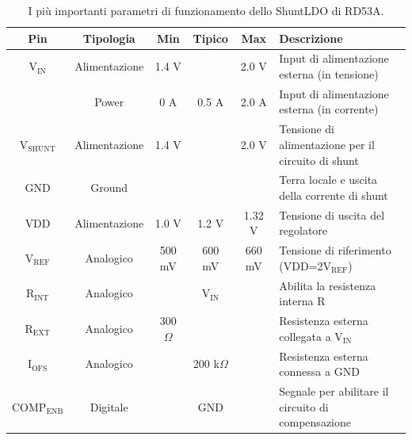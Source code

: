 \begin{table}
\begin{small}
\noindent\setlength\tabcolsep{4pt}%
\begin{tabularx}{\linewidth}{|c|c|c|c|c|X|}
\hline
\textbf{Pin} & \textbf{Tipologia} & \textbf{Min} & \textbf{Tipico} & \textbf{Max} & \textbf{Descrizione} \\ \hline
$\mathrm{V_{IN}}$ & Alimentazione & 1.4 V & & 2.0 V & Input di alimentazione esterna (in tensione)\\ \hline
 & Power & 0 A & 0.5 A & 2.0 A & Input di alimentazione esterna (in corrente)\\ \hline     
$\mathrm{V_{SHUNT}}$ & Alimentazione & 1.4 V & & 2.0 V & Tensione di alimentazione per il circuito di shunt\\ \hline
GND & Ground &  & &  & Terra locale e uscita della corrente di shunt\\ \hline
VDD & Alimentazione & 1.0 V & 1.2 V & 1.32 V & Tensione di uscita del regolatore\\ \hline
$\mathrm{V_{REF}}$ & Analogico & 500 mV & 600 mV & 660 mV & Tensione di riferimento (VDD=2$\mathrm{V_{REF}}$)\\ \hline
$\mathrm{R_{INT}}$ & Analogico &  & $\mathrm{V_{IN}}$ &  & Abilita la resistenza interna R\\ \hline
$\mathrm{R_{EXT}}$ & Analogico & 300 $\Omega$ &  &  & Resistenza esterna collegata a $\mathrm{V_{IN}}$\\ \hline
$\mathrm{I_{OFS}}$ & Analogico &  & 200 k$\Omega$ &  & Resistenza esterna connessa a GND\\ \hline
$\mathrm{COMP_{ENB}}$ & Digitale &  & GND &  & Segnale per abilitare il circuito di compensazione\\ \hline
\end{tabularx}
\end{small}
\caption{I pi\`u importanti parametri di funzionamento dello ShuntLDO di RD53A.}
\label{tab:sldord53a}
\end{table}

